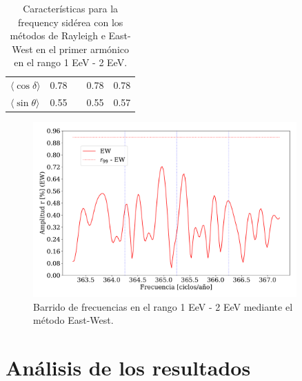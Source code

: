 \documentclass[12pt, doublespace, oneside]{article}
\begin{document}
\begin{table}[H]
\begin{small}
\begin{center}
\begin{tabular}[c]{l|c|c|c||c|}
\multicolumn{1}{|l|}{$\langle\cos\delta\rangle$}&{0.78}&  &{0.78}                        & 0.78       \\        
\multicolumn{1}{|l|}{$\langle\sin\theta\rangle$}&{0.55}&  &{0.55}                        & 0.57       \\ \hline       
\end{tabular}
            \end{center}
        \end{small}
        \vspace*{-0.21 cm}
        \caption{Características para la frequency sidérea con los métodos de Rayleigh  e East-West en el primer armónico en el rango 1 EeV - 2 EeV.}
        \label{tab:siderea_3}
    \end{table}



    \begin{figure}[H]
        \begin{small}
            \begin{center}
                \vspace*{-0.21 cm}
                \includegraphics[width=0.9\textwidth]{Figs/plot_bin_3_barrido_v3_EW.pdf}
                \vspace*{-1 cm}
            \end{center}
            \caption{Barrido de frecuencias en el rango 1 EeV - 2 EeV mediante el método East-West.}
            \label{fig:tercer_barrido}
        \end{small}
    \end{figure}    


    \section{Análisis de los resultados}
\end{document}
